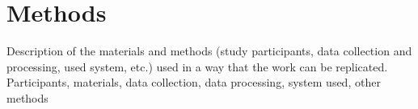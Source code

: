 \chapter{Methods}\label{ch:2}

Description of the materials and methods (study participants, data collection and processing, used system, etc.) used in a way that the work can be replicated. Participants, materials, data collection, data processing, system used, other methods 